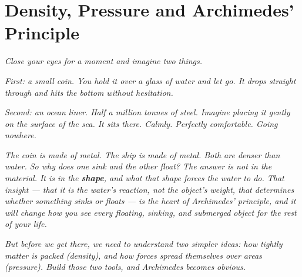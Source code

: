 %

\chapter{Density, Pressure and Archimedes' Principle}
\label{ch:density_pressure}
\minitoc
\newpage



\begin{tcolorbox}[
  enhanced,
  colback=codexblue!5,
  colframe=codexblue,
  arc=4mm,
  boxrule=1pt,
  left=10pt, right=10pt, top=10pt, bottom=10pt
]

\textit{Close your eyes for a moment and imagine two things.}

\textit{First: a small coin. You hold it over a glass of
water and let go. It drops straight through and hits the
bottom without hesitation.}

\textit{Second: an ocean liner. Half a million tonnes of
steel. Imagine placing it gently on the surface of the sea.
It sits there. Calmly. Perfectly comfortable. Going nowhere.}

\textit{The coin is made of metal. The ship is made of metal.
Both are denser than water. So why does one sink and the
other float? The answer is not in the material. It is in the
\textbf{shape}, and what that shape forces the water to do.
That insight --- that it is the water's reaction, not the
object's weight, that determines whether something sinks or
floats --- is the heart of Archimedes' principle, and it will
change how you see every floating, sinking, and submerged
object for the rest of your life.}

\textit{But before we get there, we need to understand two
simpler ideas: how tightly matter is packed (density), and
how forces spread themselves over areas (pressure). Build
those two tools, and Archimedes becomes obvious.}

\end{tcolorbox}

